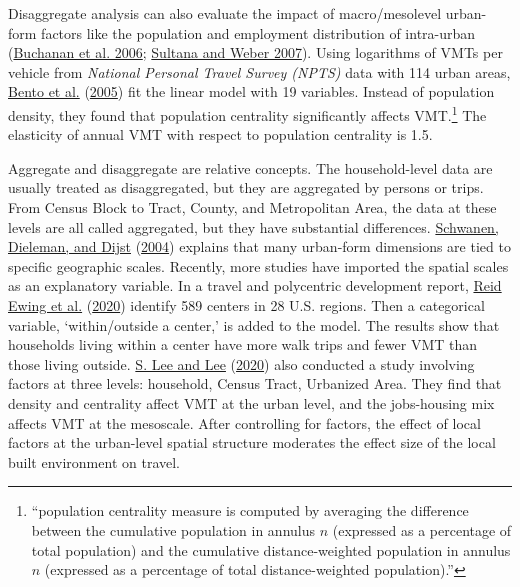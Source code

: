 \documentclass[
  12pt,
]{article}
\begin{document}
Disaggregate analysis can also evaluate the impact of macro/mesolevel urban-form factors like the population and employment distribution of intra-urban (\protect\hyperlink{ref-buchananEffectUrbanGrowth2006}{Buchanan et al. 2006}; \protect\hyperlink{ref-sultanaJourneytoWorkPatternsAge2007}{Sultana and Weber 2007}). Using logarithms of VMTs per vehicle from \emph{National Personal Travel Survey (NPTS)} data with 114 urban areas, \protect\hyperlink{ref-bentoEffectsUrbanSpatial2005}{Bento et al.} (\protect\hyperlink{ref-bentoEffectsUrbanSpatial2005}{2005}) fit the linear model with 19 variables. Instead of population density, they found that population centrality significantly affects VMT.\footnote{``population centrality measure is computed by averaging the difference between the cumulative population in annulus \(n\) (expressed as a percentage of total population) and the cumulative distance-weighted population in annulus \(n\) (expressed as a percentage of total distance-weighted population).''} The elasticity of annual VMT with respect to population centrality is 1.5.

Aggregate and disaggregate are relative concepts. The household-level data are usually treated as disaggregated, but they are aggregated by persons or trips. From Census Block to Tract, County, and Metropolitan Area, the data at these levels are all called aggregated, but they have substantial differences. \protect\hyperlink{ref-schwanenImpactMetropolitanStructure2004}{Schwanen, Dieleman, and Dijst} (\protect\hyperlink{ref-schwanenImpactMetropolitanStructure2004}{2004}) explains that many urban-form dimensions are tied to specific geographic scales. Recently, more studies have imported the spatial scales as an explanatory variable. In a travel and polycentric development report, \protect\hyperlink{ref-ewingReducingVehicleMiles2020}{Reid Ewing et al.} (\protect\hyperlink{ref-ewingReducingVehicleMiles2020}{2020}) identify 589 centers in 28 U.S. regions. Then a categorical variable, `within/outside a center,' is added to the model. The results show that households living within a center have more walk trips and fewer VMT than those living outside. \protect\hyperlink{ref-leeComparingImpactsLocal2020}{S. Lee and Lee} (\protect\hyperlink{ref-leeComparingImpactsLocal2020}{2020}) also conducted a study involving factors at three levels: household, Census Tract, Urbanized Area. They find that density and centrality affect VMT at the urban level, and the jobs-housing mix affects VMT at the mesoscale. After controlling for factors, the effect of local factors at the urban-level spatial structure moderates the effect size of the local built environment on travel.
\end{document}
